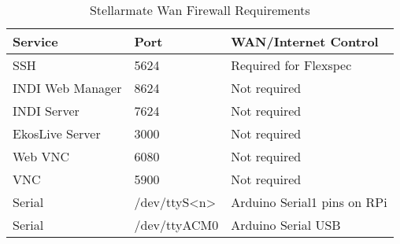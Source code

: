 \begin{table}[h!]
\centering
\begin{tabular}{| l | l | l |}
\hline
Service           & Port            &  WAN/Internet Control        \\ 
\hline
SSH               & 5624            & Required for Flexspec        \\ 
INDI Web Manager  & 8624            & Not required                 \\ 
INDI Server       & 7624            & Not required                 \\ 
EkosLive Server   & 3000            & Not required                 \\ 
Web VNC           & 6080            & Not required                 \\ 
VNC               & 5900            & Not required                 \\ 
Serial            & /dev/ttyS<n>    & Arduino Serial1 pins on RPi  \\ 
Serial            & /dev/ttyACM0    & Arduino Serial USB           \\ 
\hline
\end{tabular}
\caption[Stellarmate Wan Ports]{Stellarmate Wan Firewall Requirements}
\end{table}
